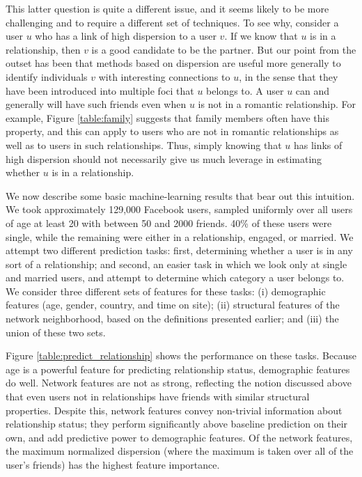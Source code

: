 \documentclass{sigchi}
\begin{document}
This latter question is quite a different issue, and it seems likely to
be more challenging and to require a different set of techniques.
To see why, consider a user $u$ who has a link of high dispersion to
a user $v$.
If we know that $u$ is in a relationship, then $v$ is a good candidate
to be the partner.
But our point from the outset has been that methods based on 
dispersion are useful more generally to identify individuals $v$
with interesting connections to $u$, in the sense that they have
been introduced into multiple foci that $u$ belongs to.
A user $u$ can and generally will have such friends even
when $u$ is not in a romantic relationship.
For example, Figure \ref{table:family} suggests that family members
often have this property, and this can apply to users who are
not in romantic relationships as well as to users in such relationships.
Thus, simply knowing that $u$ has links of high dispersion 
should not necessarily give us much leverage in estimating
whether $u$ is in a relationship.

We now describe some basic machine-learning results that bear out
this intuition.  We took approximately 129,000 Facebook users,
sampled uniformly over all users of age at least 20
with between 50 and 2000 friends.
40\% of these users were single, while the remaining were either in a
relationship, engaged, or married.  
We attempt two different prediction tasks: first, determining whether
a user is in any sort of a relationship; and second, an easier
task in which we look only at single and married users, and
attempt to determine which category a user belongs to.
We consider three different sets of features for these tasks:
(i) demographic features (age, gender, country, and time on site);
(ii) structural features of the network neighborhood, 
based on the definitions presented earlier; and (iii) the union
of these two sets.

Figure \ref{table:predict_relationship} shows the performance on these 
tasks.  Because age is a 
powerful feature for predicting relationship status, demographic
features do well.
Network features are not as strong, reflecting the notion discussed
above that even users not in relationships have friends with
similar structural properties.
Despite this, network features convey non-trivial 
information about relationship status; they perform significantly
above baseline prediction on their own, and 
add predictive power to demographic features.  Of
the network features, the maximum normalized dispersion 
(where the maximum is taken over all of the user's friends) 
has the highest feature importance.
\end{document}

